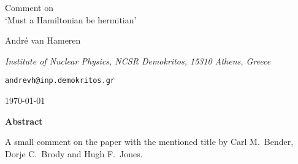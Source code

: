 \documentclass[a4paper,12pt]{article}
\renewcommand{\baselinestretch}{1.1}
\begin{document}
\begin{center}
%
{\Huge Comment on}\\\vspace{0.5\baselineskip}
{\Huge `Must a Hamiltonian be hermitian'}

\vspace{2\baselineskip}%
{\Large Andr\'e van Hameren%
}

\vspace{0.25\baselineskip}%
{\it\large Institute of Nuclear Physics, NCSR Demokritos, 15310 Athens, Greece}

\vspace{0.25\baselineskip}%
{\tt\large andrevh@inp.demokritos.gr}

\vspace{0.25\baselineskip}%
{\large\today}

\renewcommand{\baselinestretch}{1}
\vspace{2\baselineskip}%
{\bf Abstract}\\\vspace{0.5\baselineskip}
\parbox{0.8\linewidth}{\small\hspace{15pt}%
A small comment on the paper with the mentioned title by Carl M.\ Bender, Dorje C.\ Brody and Hugh F.\ Jones.
%
}
\end{center}
\vspace{\baselineskip}
\end{document}
